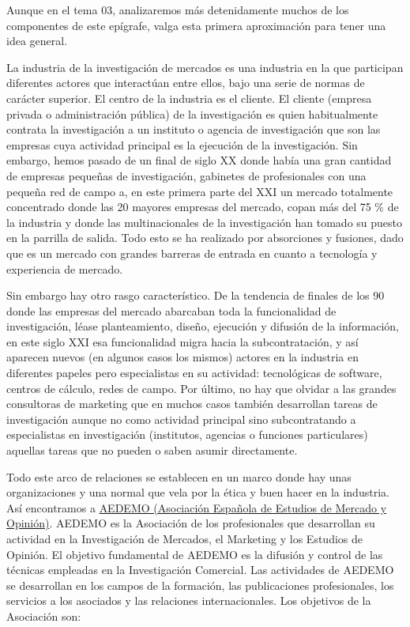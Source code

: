 \documentclass[
]{book}
\begin{document}
Aunque en el tema 03, analizaremos más detenidamente muchos de los componentes de este epígrafe, valga esta primera aproximación para tener una idea general.

La industria de la investigación de mercados es una industria en la que participan diferentes actores que interactúan entre ellos, bajo una serie de normas de carácter superior. El centro de la industria es el cliente. El cliente (empresa privada o administración pública) de la investigación es quien habitualmente contrata la investigación a un instituto o agencia de investigación que son las empresas cuya actividad principal es la ejecución de la investigación. Sin embargo, hemos pasado de un final de siglo XX donde había una gran cantidad de empresas pequeñas de investigación, gabinetes de profesionales con una pequeña red de campo a, en este primera parte del XXI un mercado totalmente concentrado donde las 20 mayores empresas del mercado, copan más del 75 \% de la industria y donde las multinacionales de la investigación han tomado su puesto en la parrilla de salida. Todo esto se ha realizado por absorciones y fusiones, dado que es un mercado con grandes barreras de entrada en cuanto a tecnología y experiencia de mercado.

Sin embargo hay otro rasgo característico. De la tendencia de finales de los 90 donde las empresas del mercado abarcaban toda la funcionalidad de investigación, léase planteamiento, diseño, ejecución y difusión de la información, en este siglo XXI esa funcionalidad migra hacia la subcontratación, y así aparecen nuevos (en algunos casos los mismos) actores en la industria en diferentes papeles pero especialistas en su actividad: tecnológicas de software, centros de cálculo, redes de campo. Por último, no hay que olvidar a las grandes consultoras de marketing que en muchos casos también desarrollan tareas de investigación aunque no como actividad principal sino subcontratando a especialistas en investigación (institutos, agencias o funciones particulares) aquellas tareas que no pueden o saben asumir directamente.

Todo este arco de relaciones se establecen en un marco donde hay unas organizaciones y una normal que vela por la ética y buen hacer en la industria. Así encontramos a \href{https://www.aedemo.es}{AEDEMO (Asociación Española de Estudios de Mercado y Opinión)}. AEDEMO es la Asociación de los profesionales que desarrollan su actividad en la Investigación de Mercados, el Marketing y los Estudios de Opinión. El objetivo fundamental de AEDEMO es la difusión y control de las técnicas empleadas en la Investigación Comercial. Las actividades de AEDEMO se desarrollan en los campos de la formación, las publicaciones profesionales, los servicios a los asociados y las relaciones internacionales. Los objetivos de la Asociación son:
\end{document}
